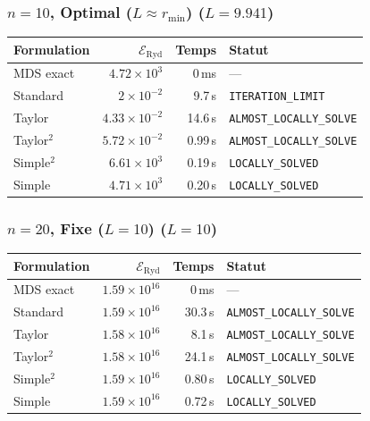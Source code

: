 \subsubsection{$n=10$, Optimal ($L{\approx}r_{\min}$) ($L=9.941$)}
\begin{longtable}{@{}lrrl@{}}
  \toprule
  Formulation & $\mathcal{E}_{\mathrm{Ryd}}$ & Temps & Statut \\
  \midrule
  \endhead
  MDS exact & $4.72\times10^{3}$ & 0\,ms & --- \\
  Standard & $2\times10^{-2}$ & 9.7\,s & \texttt{ITERATION\_LIMIT} \\
  Taylor & $4.33\times10^{-2}$ & 14.6\,s & \texttt{ALMOST\_LOCALLY\_SOLVE} \\
  Taylor$^2$ & $5.72\times10^{-2}$ & 0.99\,s & \texttt{ALMOST\_LOCALLY\_SOLVE} \\
  Simple$^2$ & $6.61\times10^{3}$ & 0.19\,s & \texttt{LOCALLY\_SOLVED} \\
  Simple & $4.71\times10^{3}$ & 0.20\,s & \texttt{LOCALLY\_SOLVED} \\
  \bottomrule
\end{longtable}

\subsubsection{$n=20$, Fixe ($L{=}10$) ($L=10$)}
\begin{longtable}{@{}lrrl@{}}
  \toprule
  Formulation & $\mathcal{E}_{\mathrm{Ryd}}$ & Temps & Statut \\
  \midrule
  \endhead
  MDS exact & $1.59\times10^{16}$ & 0\,ms & --- \\
  Standard & $1.59\times10^{16}$ & 30.3\,s & \texttt{ALMOST\_LOCALLY\_SOLVE} \\
  Taylor & $1.58\times10^{16}$ & 8.1\,s & \texttt{ALMOST\_LOCALLY\_SOLVE} \\
  Taylor$^2$ & $1.58\times10^{16}$ & 24.1\,s & \texttt{ALMOST\_LOCALLY\_SOLVE} \\
  Simple$^2$ & $1.59\times10^{16}$ & 0.80\,s & \texttt{LOCALLY\_SOLVED} \\
  Simple & $1.59\times10^{16}$ & 0.72\,s & \texttt{LOCALLY\_SOLVED} \\
  \bottomrule
\end{longtable}

